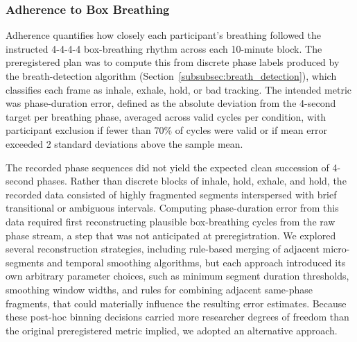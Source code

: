\documentclass[pdflatex,sn-basic,lineno]{sn-jnl}
\begin{document}
\subsubsection{Adherence to Box Breathing}\label{subsubsec:measures_adherence}
Adherence quantifies how closely each participant's breathing followed the instructed 4-4-4-4 box-breathing rhythm across each 10-minute block. The preregistered plan was to compute this from discrete phase labels produced by the breath-detection algorithm (Section~\ref{subsubsec:breath_detection}), which classifies each frame as inhale, exhale, hold, or bad tracking. The intended metric was phase-duration error, defined as the absolute deviation from the 4-second target per breathing phase, averaged across valid cycles per condition, with participant exclusion if fewer than 70\% of cycles were valid or if mean error exceeded 2 standard deviations above the sample mean.

The recorded phase sequences did not yield the expected clean succession of 4-second phases. Rather than discrete blocks of inhale, hold, exhale, and hold, the recorded data consisted of highly fragmented segments interspersed with brief transitional or ambiguous intervals. Computing phase-duration error from this data required first reconstructing plausible box-breathing cycles from the raw phase stream, a step that was not anticipated at preregistration. We explored several reconstruction strategies, including rule-based merging of adjacent micro-segments and temporal smoothing algorithms, but each approach introduced its own arbitrary parameter choices, such as minimum segment duration thresholds, smoothing window widths, and rules for combining adjacent same-phase fragments, that could materially influence the resulting error estimates. Because these post-hoc binning decisions carried more researcher degrees of freedom than the original preregistered metric implied, we adopted an alternative approach.
\end{document}
